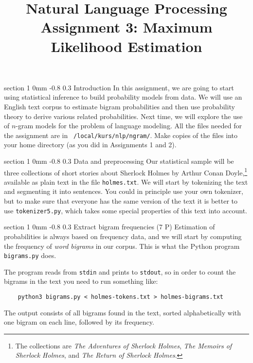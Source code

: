 \documentclass[11pt]{article}
\title{{\LARGE Natural Language Processing}\\[1.5mm]{\large Assignment 3: Maximum Likelihood Estimation}}
\author{}
\date{} %
\makeatletter
\newcommand{\newsec}[2]{\section{#1}\label{sec:#2}\noindent}
\renewcommand{\section}{\@startsection
{section}%
{1}%
{0mm}%
{-0.8\baselineskip}%
{0.3\baselineskip}%
{\bfseries\large}}%
\makeatother
\begin{document}
 

\maketitle
\vspace{-2mm} \newsec{Introduction}{intro}%
In this assignment, we are going to start using statistical inference
to build probability models from data.  We will use an English text
corpus to estimate bigram probabilities and then use probability
theory to derive various related probabilities. Next time, we will
explore the use of $n$-gram models for the problem of language
modeling. All the files needed for the assignment are in {\tt
  /local/kurs/nlp/ngram/}. Make copies of the files into your home
directory (as you did in Assignments 1 and 2).

\newsec{Data and preprocessing}{data}%
Our statistical sample will be three collections of short stories
about Sherlock Holmes by Arthur Conan Doyle,\footnote{The collections
  are {\em The Adventures of Sherlock Holmes}, {\em The Memoirs of
    Sherlock Holmes}, and {\em The Return of Sherlock Holmes}.}
available as plain text in the file {\tt holmes.txt}. We will start by
tokenizing the text and segmenting it into sentences.  You could in
principle use your own tokenizer, but to make sure that everyone has
the same version of the text it is better to use {\tt tokenizer5.py},
which takes some special properties of this text into account.

\newsec{Extract bigram frequencies (7 P)}{bigrams}%
Estimation of probabilities is always based on frequency data, and we
will start by computing the frequency of \emph{word bigrams} in our
corpus. This is what the Python program {\tt bigrams.py} does.

\begin{center}
\fbox{

}
\end{center}
\newpage
\noindent
The program reads from {\tt stdin} and prints to {\tt stdout}, so in
order to count the bigrams in the text you need to run something like:
\begin{verbatim}
    python3 bigrams.py < holmes-tokens.txt > holmes-bigrams.txt
\end{verbatim}
The output consists of all bigrams found in the text, sorted
alphabetically with one bigram on each line, followed by its
frequency.
\end{document}
